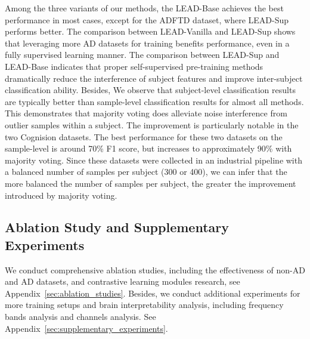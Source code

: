 Among the three variants of our methods, the LEAD-Base achieves the best performance in most cases, except for the ADFTD dataset, where LEAD-Sup performs better. The comparison between LEAD-Vanilla and LEAD-Sup shows that leveraging more AD datasets for training benefits performance, even in a fully supervised learning manner. The comparison between LEAD-Sup and LEAD-Base indicates that proper self-supervised pre-training methods dramatically reduce the interference of subject features and improve inter-subject classification ability. Besides, We observe that subject-level classification results are typically better than sample-level classification results for almost all methods. This demonstrates that majority voting does alleviate noise interference from outlier samples within a subject. The improvement is particularly notable in the two Cognision datasets. The best performance for these two datasets on the sample-level is around 70\% F1 score, but increases to approximately 90\% with majority voting. Since these datasets were collected in an industrial pipeline with a balanced number of samples per subject (300 or 400), we can infer that the more balanced the number of samples per subject, the greater the improvement introduced by majority voting.






\subsection{Ablation Study and Supplementary Experiments}
\label{sub:ablation_study_supplementary_experiments}
We conduct comprehensive ablation studies, including the effectiveness of non-AD and AD datasets, and contrastive learning modules research, see Appendix~\ref{sec:ablation_studies}. Besides, we conduct additional experiments for more training setups and brain interpretability analysis, including frequency bands analysis and channels analysis. See Appendix~\ref{sec:supplementary_experiments}.






